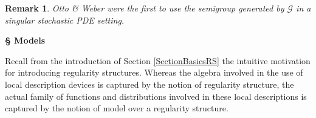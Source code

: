 \documentclass[10pt, reqno]{amsart}
\numberwithin{subsection}{section}
\numberwithin{subsubsection}{subsection}
\numberwithin{equation}{section} %
\theoremstyle{mystyle}
\theoremstyle{mystyle2}
\newtheorem*{Remark*}{Remark}
\theoremstyle{mystyle3}
\newcommand{\mcG}{\mathcal{G}}
\begin{document}
\bigskip

\begin{Remark*}
Otto \& Weber \cite{OttoWeber} were the first to use the semigroup generated by $\mcG$ in a singular stochastic PDE setting.
\end{Remark*}



\bigskip


\hfill \textsf{\textbf{ {\Large \S} Models}}

\medskip

Recall from the introduction of Section \ref{SectionBasicsRS} the intuitive motivation for introducing regularity structures. Whereas the algebra involved in the use of local description devices is captured by the notion of regularity structure, the actual family of functions and distributions involved in these local descriptions is captured by the notion of model over a regularity structure. 

\smallskip
\end{document}
